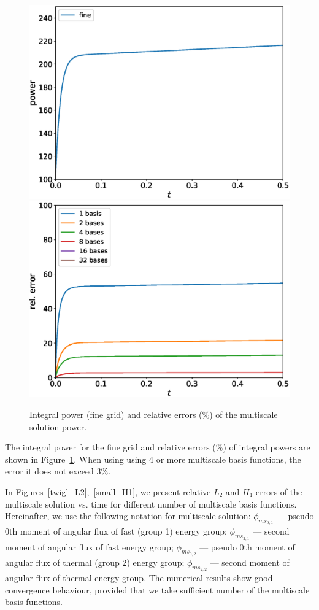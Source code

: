 \documentclass[preprint]{elsarticle}
\begin{document}
\begin{figure}[ht]
	\centering
		\includegraphics[width=0.45\linewidth]{twigl/power_fine.eps} \hspace{2em}
		\includegraphics[width=0.45\linewidth]{twigl/power_error.eps}
	\caption{Integral power (fine grid) and relative errors ($\%$) of the multiscale solution power.}
	\label{twigl_power}
\end{figure}

The integral power for the fine grid and relative errors ($\%$) of integral powers are shown in Figure~\ref{twigl_power}.
When using using 4 or more multiscale basis functions, the error it does not exceed 3\%.

In Figures~\ref{twigl_L2},~\ref{small_H1}, we present relative $L_2$ and $H_1$ errors of the multiscale solution vs. time for different number of multiscale basis functions. Hereinafter, we use the following notation for multiscale solution: $\phi_{ms_{0, 1}}$ --- pseudo 0th moment of angular flux of fast (group 1) energy group;  $\phi_{ms_{2, 1}}$ --- second moment of angular flux of fast energy group; $\phi_{ms_{0, 2}}$ --- pseudo 0th moment of angular flux of thermal (group 2) energy group;  $\phi_{ms_{2, 2}}$ --- second moment of angular flux of thermal energy group.
The numerical results show good convergence behaviour, provided that we take sufficient number of the multiscale basis functions.
\end{document}
